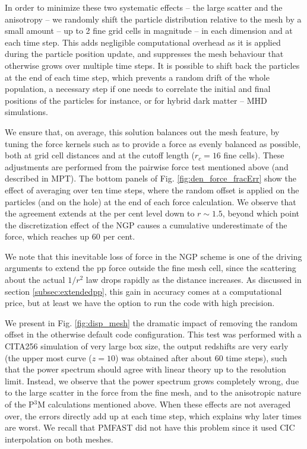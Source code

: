 \documentclass[useAMS,usenatbib]{mn2e}
\begin{document}
In order to minimize these two systematic effects -- the large scatter and the anisotropy -- 
we randomly shift the particle distribution relative to the mesh by a small
amount -- up to 2 fine grid cells in magnitude -- in each
dimension and at each time step.  This adds negligible computational
overhead as it is applied during the particle position update,
and suppresses the mesh behaviour that otherwise grows over multiple time steps.
It is possible to shift back the particles at the end of each time step,
which prevents a random drift of the whole population, a necessary step 
if one needs to correlate the initial and final positions of the particles for instance,
or for hybrid dark matter -- MHD simulations.
 
We ensure that, on average, this solution balances out the mesh feature,
by tuning the force kernels such as to provide a force as evenly balanced as possible, both at grid cell distances
and at the cutoff length ($r_{c}=16$ fine cells).
These adjustments are performed from the pairwise force test mentioned above (and described in MPT).
The bottom panels of Fig. \ref{fig:den_force_fracErr} show the effect of averaging over ten time steps, 
where the random offset is applied on the particles (and on the hole) at the end of each force calculation. 
We observe that the agreement extends at the per cent level down to $r \sim 1.5$, beyond which point
the discretization effect of the NGP causes a cumulative underestimate of the force, which reaches up 60 per cent.

We note that this inevitable loss of force in the NGP scheme is one of the driving arguments to extend the pp force outside the fine mesh cell,
since the scattering about the actual $1/r^{2}$ law drops rapidly as the distance increases.
As discussed in section \ref{subsec:extendedpp}, this gain in accuracy comes at a computational price,
but at least we have the option to run the code with high precision.

We present in Fig. \ref{fig:disp_mesh} the dramatic impact of removing the random offset in the otherwise default code configuration.
This test was performed with a CITA256 simulation of very large box size,
the output redshifts are very early (the upper most curve ($z=10$) was obtained after
about 60 time steps), such that the power spectrum should agree with linear theory up to the resolution limit.
Instead, we observe that the power spectrum grows completely wrong, due to the large scatter in the force from the fine mesh,
and to the anisotropic nature of the P$^3$M calculations mentioned above.
When these effects are not averaged over, the errors directly add up at each time step,
which explains why later times are worst.
We recall that {\small PMFAST} did not have this problem since it used CIC interpolation on both meshes.  
\end{document}
